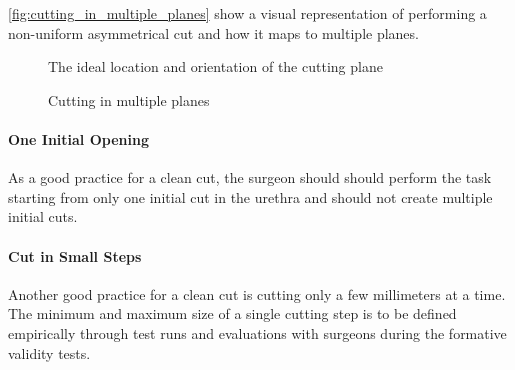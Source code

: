 \autoref{fig:cutting_in_multiple_planes} show a visual representation of performing a non-uniform asymmetrical cut and how it maps to multiple planes.

\begin{figure}
  \centering%
  \hfill%
  \hfill%
  \caption{The ideal location and orientation of the cutting plane}
  \label{fig:plane_location_orientation}
\end{figure}

\begin{figure}
  \centering%
  \hfill%
  \caption{Cutting in multiple planes}
  \label{fig:cutting_in_multiple_planes}
\end{figure}

\paragraph{One Initial Opening}
\label{par:metric_2}
As a good practice for a clean cut, the surgeon should should perform the task starting from only one initial cut in the urethra and should not create multiple initial cuts.

\paragraph{Cut in Small Steps}
\label{par:metric_3}
Another good practice for a clean cut is cutting only a few millimeters at a time. The minimum and maximum size of a single cutting step is to be defined empirically through test runs and evaluations with surgeons during the formative validity tests.


